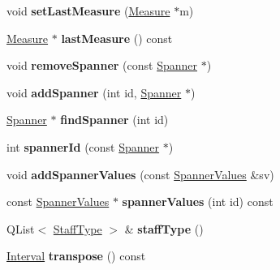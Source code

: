 \begin{DoxyCompactItemize}
void {\bfseries set\+Last\+Measure} (\hyperlink{class_ms_1_1_measure}{Measure} $\ast$m)
\item 
\mbox{\label{class_ms_1_1_xml_reader_a20741a81f2684abe91fdb1230e3cc652}} 
\hyperlink{class_ms_1_1_measure}{Measure} $\ast$ {\bfseries last\+Measure} () const
\item 
\mbox{\label{class_ms_1_1_xml_reader_a2d3a617a9b7b3d1f31e906cec9f3a4e9}} 
void {\bfseries remove\+Spanner} (const \hyperlink{class_ms_1_1_spanner}{Spanner} $\ast$)
\item 
\mbox{\label{class_ms_1_1_xml_reader_a117d02cfe36984d6bc0dd1892ad15d34}} 
void {\bfseries add\+Spanner} (int id, \hyperlink{class_ms_1_1_spanner}{Spanner} $\ast$)
\item 
\mbox{\label{class_ms_1_1_xml_reader_a84bc655a108eccbfc3ed10cd47a3cdfb}} 
\hyperlink{class_ms_1_1_spanner}{Spanner} $\ast$ {\bfseries find\+Spanner} (int id)
\item 
\mbox{\label{class_ms_1_1_xml_reader_afd54b35b19fa1dd4a17bd0ab015c2366}} 
int {\bfseries spanner\+Id} (const \hyperlink{class_ms_1_1_spanner}{Spanner} $\ast$)
\item 
\mbox{\label{class_ms_1_1_xml_reader_a936812b8d73a66586cb276b81cb7440d}} 
void {\bfseries add\+Spanner\+Values} (const \hyperlink{struct_ms_1_1_spanner_values}{Spanner\+Values} \&sv)
\item 
\mbox{\label{class_ms_1_1_xml_reader_a9023c58214b1633e6fb57486f76b8b69}} 
const \hyperlink{struct_ms_1_1_spanner_values}{Spanner\+Values} $\ast$ {\bfseries spanner\+Values} (int id) const
\item 
\mbox{\label{class_ms_1_1_xml_reader_a94cf5e8504cb75c6444c58c7b8bdbbbb}} 
Q\+List$<$ \hyperlink{class_ms_1_1_staff_type}{Staff\+Type} $>$ \& {\bfseries staff\+Type} ()
\item 
\mbox{\label{class_ms_1_1_xml_reader_a63c287934d8c622375123b09dc50151b}} 
\hyperlink{struct_ms_1_1_interval}{Interval} {\bfseries transpose} () const

\end{DoxyCompactItemize}
